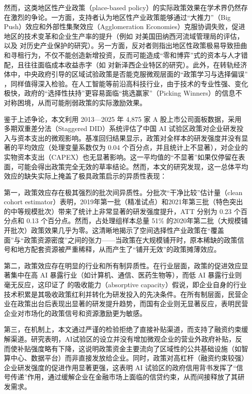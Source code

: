 \documentclass[12pt,hyperref,a4paper,UTF8]{ctexart}
\begin{document}
然而，这类地区性产业政策（place-based policy）的实际政策效果在学术界仍然存在激烈的争论。一方面，支持者认为地区性产业政策能够通过“大推力”（Big Push）效应和外部性集聚效应（Agglomeration Economies）克服协调失败，促进地区的技术变革和企业生产率的提升（例如 \textcite{kline2014local} 对美国田纳西河流域管理局的评估，以及 \textcite{juhasz2018temporary} 对历史产业保护的研究）。另一方面，反对者则指出地区性政策极易导致扭曲和寻租行为，不仅不能创造新增投资，反而可能造成“零和博弈”式的资本与人才错配，且往往面临成本收益赤字（如 \textcite{neumark2011enterprise} 对新泽西企业特区的研究）。此外，在转轨经济体中，中央政府引导的区域试验政策是否能克服微观层面的“政策学习与选择偏误” \parencite{barwick2021policy}，同样值得深入检验。在人工智能等前沿高科技行业，由于技术的专业性强、变化极快，政府的“选择性扶持”更容易面临“挑选赢家”（Picking Winners）的信息不对称困境，从而可能削弱政策的实际激励效果。

鉴于上述争论，本文利用 2013—2025 年 4,875 家 A 股上市公司面板数据，采用多期双重差分法（Staggered DID）系统评估了中国 AI 试验区政策对企业研发投入与资本支出的微观影响。基准回归结果显示，政策对全样本的研发强度并没有显著的平均效应（处理变量系数仅为 0.04 个百分点，并且统计上不显著），对企业的实物资本支出（CAPEX）也无显著影响。这一平均值的“不显著”如果仅停留在表面，可能会得出政策完全无效的草率结论。然而，本文的研究发现，这一总体平均效应的缺失实际上掩盖了极具政策启示的异质性表现：

第一，政策效应存在极其强烈的批次间异质性。分批次“干净比较”估计量（clean cohort estimator）表明，2019年第一批（精准试点）和2021年第三批（特色突出的中等规模批次）带来了统计上非常显著的研发强度提升，ATT 分别为 0.23 个百分点和 0.13 个百分点。然而，占处理组样本总量 51\% 的2020年第二批（大规模铺开批次）政策效果几乎为零。这清晰地揭示了空间选择性产业政策在“覆盖面”与“政策资源密度”之间的张力——当政策在大规模铺开时，原本稀缺的政策信号和地方配套资源被严重稀释，从而产生了“铺开无效”的政策摊薄效应。

第二，政策效应存在明显的行业和所有制异质性。在行业层面，政策的促进效应显著集中在高 AI 暴露行业（如计算机、通信、医药生物等），而低 AI 暴露行业则毫无反应，这印证了 \textcite{cohen1990absorptive} 的吸收能力（absorptive capacity）假说，即企业自身的行业技术积累是其吸收政策红利并转化为研发投入的先决条件。在所有制层面，民营企业在政策出台后表现出显著的研发提升趋势，而国有企业则无显著反应，表明民营企业对市场化的政策信号和资源激励更为敏感。

第三，在机制上，本文通过严谨的检验拒绝了直接补贴渠道，而支持了融资约束缓解渠道。研究表明，AI试验区的设立并没有增加微观企业的营业外政府补贴，反而使补贴强度略有下降，这说明政策资金主要流向了区域性的公共基础设施（如智算中心、数据平台）而非直接发放给企业。同时，政策对高杠杆（融资约束较强）企业研发强度的促进作用显著更强，这表明 AI 试验区的政府信用背书发挥了“信号传递”作用，通过缓解企业在金融市场上面临的信贷约束，从而间接释放了其研发需求。
\end{document}
